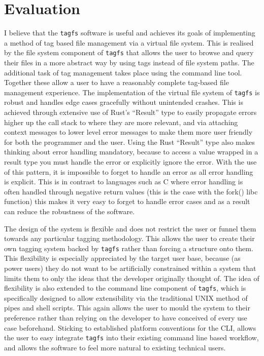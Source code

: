 \chapter{Evaluation}
\vspace{1cm}




I believe that the \texttt{tagfs} software is useful and achieves its goals of
implementing a method of tag based file management via a virtual file system.
This is realised by the file system component of \texttt{tagfs} that allows the
user to browse and query their files in a more abstract way by using tags
instead of file system paths. The additional task of tag management takes place
using the command line tool. Together these allow a user to have a reasonably
complete tag-based file management experience. The implementation of the
virtual file system of \texttt{tagfs} is robust and handles edge cases
gracefully without unintended crashes. This is achieved through extensive use
of Rust's ``Result'' type to easily propagate errors higher up the call stack
to where they are more relevant, and via attaching context messages to lower
level error messages to make them more user friendly for both the programmer
and the user. Using the Rust ``Result'' type also makes thinking about error
handling mandatory, because to access a value wrapped in a result type you must
handle the error or explicitly ignore the error. With the use of this pattern,
it is impossible to forget to handle an error as all error handling is
explicit. This is in contrast to languages such as C where error handling is
often handled through negative return values (this is the case with the fork()
libc function) this makes it very easy to forget to handle error cases and as a
result can reduce the robustness of the software.

The design of the system is flexible and does not restrict the user or funnel
them towards any particular tagging methodology. This allows the user to create
their own tagging system backed by \texttt{tagfs} rather than forcing a
structure onto them. This flexibility is especially appreciated by the target
user base, because (as power users) they do not want to be artificially
constrained within a system that limits them to only the ideas that the
developer originally thought of. The idea of flexibility is also extended to
the command line component of \texttt{tagfs}, which is specifically designed to
allow extensibility via the traditional UNIX method of pipes and shell scripts.
This again allows the user to mould the system to their preference rather than
relying on the developer to have conceived of every use case beforehand.
Sticking to established platform conventions for the CLI, allows the user to
easy integrate \texttt{tagfs} into their existing command line based workflow,
and allows the software to feel more natural to existing technical users.

